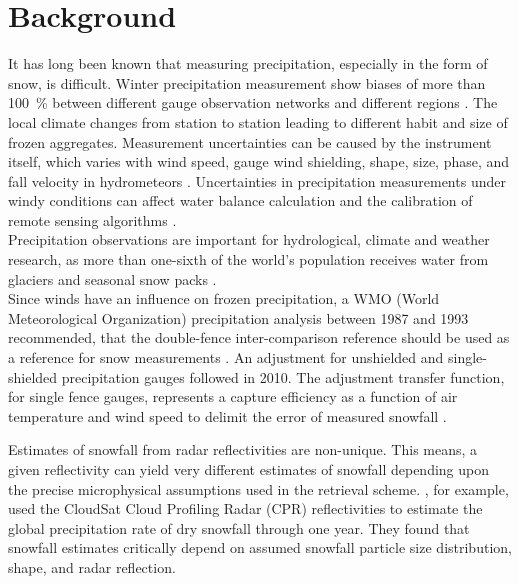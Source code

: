 \section{Background}
It has long been known that measuring precipitation, especially in the form of snow, is difficult. Winter precipitation measurement show biases of more than \SI{100}{\percent} between different gauge observation networks and different regions \citep{kochendorfer_analysis_2017}. The local climate changes from station to station leading to different habit and size of frozen aggregates. Measurement uncertainties can be caused by the instrument itself, which varies with wind speed, gauge wind shielding, shape, size, phase, and fall velocity in hydrometeors \citep{kochendorfer_analysis_2017,wolff_derivation_2015}. 
Uncertainties in precipitation measurements under windy conditions can affect water balance calculation and the calibration of remote sensing algorithms \citep{wolff_derivation_2015}. 
\\
Precipitation observations are important for hydrological, climate and weather research, as more than one-sixth of the world's population receives water from glaciers and seasonal snow packs \citep{barnett_potential_2005}.
\\
Since winds have an influence on frozen precipitation, a WMO (World Meteorological Organization) precipitation analysis between 1987 and 1993 recommended, that the double-fence inter-comparison reference should be used as a reference for snow measurements \citep{goodison_wmo_1998}. An adjustment for unshielded and single-shielded precipitation gauges followed in 2010. The adjustment transfer function, for single fence gauges, represents a capture efficiency as a function of air temperature and wind speed to delimit the error of measured snowfall \citep{kochendorfer_analysis_2017,wolff_derivation_2015}.
\par\medskip
\noindent
Estimates of snowfall from radar reflectivities are non-unique. 
This means, a given reflectivity can yield very different estimates of snowfall depending upon the precise microphysical assumptions used in the retrieval scheme.
\citet{kulie_utilizing_2009}, for example, used the CloudSat Cloud Profiling Radar (CPR) reflectivities to estimate the global precipitation rate of dry snowfall through one year. They found that snowfall estimates critically depend on assumed snowfall particle size distribution, shape, and radar reflection. 
